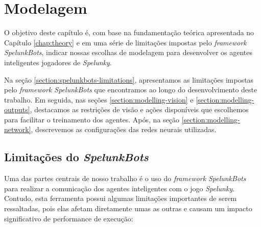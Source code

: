 \chapter{\label{chap:modeling}Modelagem}
O objetivo deste capítulo é, com base na fundamentação teórica apresentada no
Capítulo \ref{chap:theory} e em uma série de limitações impostas pelo
\textit{framework SpelunkBots}, indicar nossas escolhas de modelagem para
desenvolver os agentes inteligentes jogadores de \textit{Spelunky}.

Na seção \ref{section:spelunkbots-limitations}, apresentamos as limitações
impostas pelo \textit{framework SpelunkBots} que encontramos ao longo do
desenvolvimento deste trabalho. Em seguida, nas seções
\ref{section:modelling-vision} e \ref{section:modelling-outputs}, destacamos as
restrições de visão e ações disponíveis que escolhemos para facilitar o
treinamento dos agentes. Após, na seção \ref{section:modelling-network},
descrevemos as configurações das redes neurais utilizadas.




\section{\label{section:spelunkbots-limitations}Limitações do
\textit{SpelunkBots}}
Uma das partes centrais de nosso trabalho é o uso do \textit{framework}
\textit{SpelunkBots} para realizar a comunicação dos agentes inteligentes com o
jogo \textit{Spelunky}. Contudo, esta ferramenta possui algumas limitações
importantes de serem ressaltadas, pois elas afetam diretamente umas as outras e
causam um impacto significativo de performance de execução:

